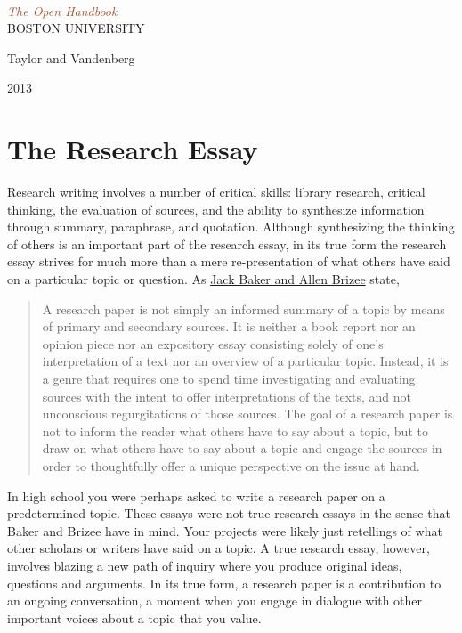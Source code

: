 \documentclass[book]{memoir}
\newcommand*{\plogo}{\fbox{$\mathcal{PL}$}} %
\newcommand*{\rotrt}[1]{\rotatebox{90}{#1}} %
\newcommand*{\rotlft}[1]{\rotatebox{-90}{#1}} %
\newcommand*{\titleBC}{\begingroup %
\centering %

\def\CP{\textit{\Huge The Open Handbook}} %

\settowidth{\unitlength}{\CP} %
{\color{LightGoldenrod}\resizebox*{\unitlength}{\baselineskip}{\rotrt{$\}$}}} \\[\baselineskip] %
\textcolor{Sienna}{\CP} \\[\baselineskip] %
{\color{RosyBrown}\Large BOSTON UNIVERSITY} \\ %
{\color{LightGoldenrod}\resizebox*{\unitlength}{\baselineskip}{\rotlft{$\}$}}} %

\vfill %

{\Large{Taylor and Vandenberg}}\\ %

\vfill %

2013 %

\endgroup}
\begin{document}
\titleBC %
\thispagestyle{empty}
\newpage

\tableofcontents
\newpage



\chapter{The Research Essay}
Research writing involves a number of critical skills: library research, critical thinking, the evaluation of sources, and the ability to synthesize information through summary, paraphrase, and quotation. Although synthesizing the thinking of others is an important part of the research essay, in its true form the research essay strives for much more than a mere re-presentation of what others have said on a particular topic or question. As \href{http://owl.english.purdue.edu/owl/resource/658/02/}{Jack Baker and Allen Brizee} state,

\begin{quote}A research paper is not simply an informed summary of a topic by means of primary and secondary sources. It is neither a book report nor an opinion piece nor an expository essay consisting solely of one's interpretation of a text nor an overview of a particular topic. Instead, it is a genre that requires one to spend time investigating and evaluating sources with the intent to offer interpretations of the texts, and not unconscious regurgitations of those sources. The goal of a research paper is not to inform the reader what others have to say about a topic, but to draw on what others have to say about a topic and engage the sources in order to thoughtfully offer a unique perspective on the issue at hand.\end{quote}

In high school you were perhaps asked to write a research paper on a predetermined topic. These essays were not true research essays in the sense that Baker and Brizee have in mind. Your projects were likely just retellings of what other scholars or writers have said on a topic. A true research essay, however, involves blazing a new path of inquiry where you produce original ideas, questions and arguments. In its true form, a research paper is a contribution to an ongoing conversation, a moment when you engage in dialogue with other important voices about a topic that you value.
\end{document}
